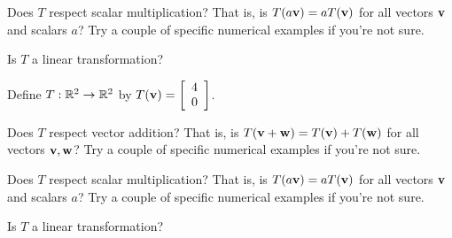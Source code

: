 Does $T$ respect scalar multiplication?  
That is, is $T(a\mathbf{v}) = aT(\mathbf{v})$ for all vectors $\mathbf{v}$ and scalars $a$?
Try a couple of specific numerical examples if you're not sure.  



Is $T$ a linear transformation?


\edXsolution{ 
}

\endedxproblem


Define $T: \mathbb R^2 \rightarrow \mathbb R^2$ by $T(\mathbf{v}) = \left[\begin{array}{c}
4 \\
0 
\end{array} \right]$.  

Does $T$ respect vector addition?  That is, is $T(\mathbf{v} + \mathbf{w}) = T(\mathbf{v}) + T(\mathbf{w})$ for all 
vectors $\mathbf{v},\mathbf{w}$?
Try a couple of specific numerical examples if you're not sure.  


Does $T$ respect scalar multiplication?  
That is, is $T(a\mathbf{v}) = aT(\mathbf{v})$ for all vectors $\mathbf{v}$ and scalars $a$?
Try a couple of specific numerical examples if you're not sure.  



Is $T$ a linear transformation?


\edXsolution{ 
}

\endedxproblem


\endedxvertical





\endedxvertical


